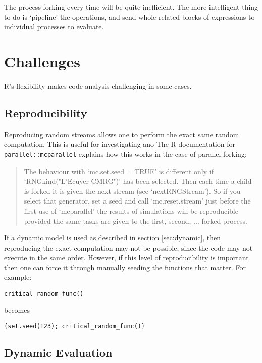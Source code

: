 \documentclass[12pt]{article}
\begin{document}
The process forking every time will be quite inefficient. The more intelligent
thing to do is `pipeline' the operations, and send whole related blocks of
expressions to individual processes to evaluate.

\section{Challenges}

R's flexibility makes code analysis challenging in some cases.

\subsection{Reproducibility}

Reproducing random streams allows one to perform the exact same random
computation. This is useful for investigating ano The R documentation for
\texttt{parallel::mcparallel} explains how this works in the case of
parallel forking:

\begin{quote}
     The behaviour with ‘mc.set.seed = TRUE’ is different only if
     ‘RNGkind("L'Ecuyer-CMRG")’ has been selected.  Then each time a child
     is forked it is given the next stream (see ‘nextRNGStream’).  So if
     you select that generator, set a seed and call ‘mc.reset.stream’ just
     before the first use of ‘mcparallel’ the results of simulations will
     be reproducible provided the same tasks are given to the first,
     second, ...  forked process.
\end{quote}

If a dynamic model is used as described in section \ref{sec:dynamic}, then
reproducing the exact computation may not be possible, since the code may not execute in the
same order. However, if this level of reproducibility is important then one
can force it through manually seeding the functions that matter. For
example:
\begin{verbatim}
critical_random_func()
\end{verbatim}
becomes
\begin{verbatim}
{set.seed(123); critical_random_func()}
\end{verbatim}

\subsection{Dynamic Evaluation}
\end{document}

